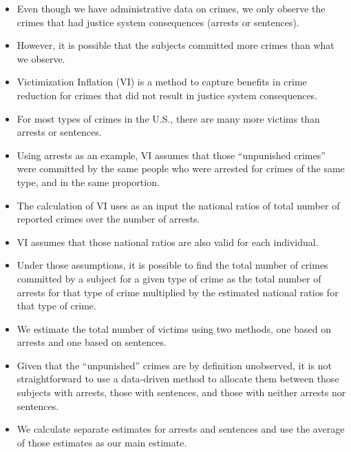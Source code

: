\documentclass[static]{JJH-Beamer}
\begin{document}
\begin{frame}

\begin{itemize}
\item Even though we have administrative data on crimes, we only observe the crimes that had justice system consequences (arrests or sentences).
\item However, it is possible that the subjects committed more crimes than what we observe.
\item Victimization Inflation (VI) is a method to capture benefits in crime reduction for crimes that did not result in justice system consequences.
\item For most types of crimes in the U.S., there are many more victims than arrests or sentences.
\item Using arrests as an example, VI assumes that those ``unpunished crimes'' were committed by the same people who were arrested for crimes of the same type, and in the same proportion.
\item The calculation of VI uses as an input the national ratios of total number of reported crimes over the number of arrests.
\end{itemize}

\end{frame}

\begin{frame}

\begin{itemize}
\item VI assumes that those national ratios are also valid for each individual.
\item Under those assumptions, it is possible to find the total number of crimes committed by a subject for a given type of crime as the total number of arrests for that type of crime multiplied by the estimated national ratios for that type of crime.
\item We estimate the total number of victims using two methods, one based on arrests and one based on sentences.
\item Given that the ``unpunished'' crimes are by definition unobserved, it is not straightforward to use a data-driven method to allocate them between those subjects with arrests, those with sentences, and those with neither arrests nor sentences.
\item We calculate separate estimates for arrests and sentences and use the average of those estimates as our main estimate.
\end{itemize}

\end{frame}
\end{document}
